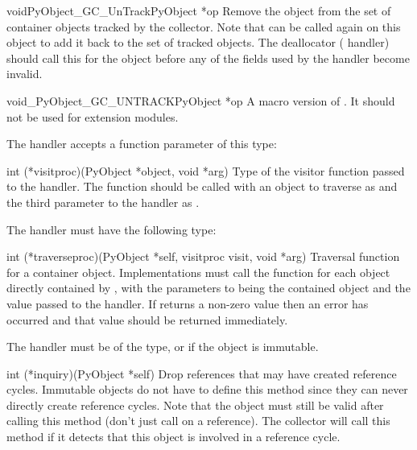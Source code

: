 \begin{cfuncdesc}{void}{PyObject_GC_UnTrack}{PyObject *op}
  Remove the object  from the set of container objects tracked
  by the collector.  Note that  can be
  called again on this object to add it back to the set of tracked
  objects.  The deallocator ( handler) should call
  this for the object before any of the fields used by the
   handler become invalid.
\end{cfuncdesc}

\begin{cfuncdesc}{void}{_PyObject_GC_UNTRACK}{PyObject *op}
  A macro version of .  It should not be
  used for extension modules.
\end{cfuncdesc}

The  handler accepts a function parameter of this
type:

\begin{ctypedesc}[visitproc]{int (*visitproc)(PyObject *object, void *arg)}
  Type of the visitor function passed to the 
  handler.  The function should be called with an object to traverse
  as  and the third parameter to the 
  handler as .
\end{ctypedesc}

The  handler must have the following type:

\begin{ctypedesc}[traverseproc]{int (*traverseproc)(PyObject *self,
                                visitproc visit, void *arg)}
  Traversal function for a container object.  Implementations must
  call the  function for each object directly contained by
  , with the parameters to  being the contained
  object and the  value passed to the handler.  If
   returns a non-zero value then an error has occurred and
  that value should be returned immediately.
\end{ctypedesc}

The  handler must be of the  type, or
\NULL{} if the object is immutable.

\begin{ctypedesc}[inquiry]{int (*inquiry)(PyObject *self)}
  Drop references that may have created reference cycles.  Immutable
  objects do not have to define this method since they can never
  directly create reference cycles.  Note that the object must still
  be valid after calling this method (don't just call
   on a reference).  The collector will call
  this method if it detects that this object is involved in a
  reference cycle.
\end{ctypedesc}
